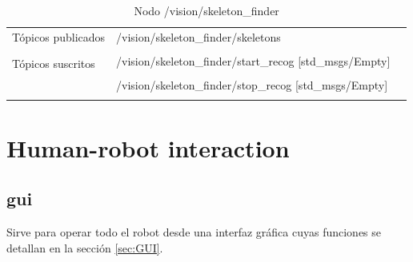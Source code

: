 \documentclass[user_manual.tex]{subfiles}
\begin{document}
\begin{table}[H]
\begin{center}
\begin{tabular}{|l|p{6cm}|p{5cm}|}%
\hline

Tópicos publicados
& /vision/skeleton\_finder/skeletons  &  \\
& & \\
\hline

\multirow{2}{*}{Tópicos suscritos}
& /vision/skeleton\_finder/start\_recog [std\_msgs/Empty] &  \\
& & \\
& /vision/skeleton\_finder/stop\_recog [std\_msgs/Empty] &  \\
& & \\
\cline{1-3}
 
\end{tabular}
\caption{Nodo /vision/skeleton\_finder}
\label{skeleton finder node}
\end{center}
\end{table}

\section{Human-robot interaction}

\subsection{gui}
Sirve para operar todo el robot desde una interfaz gráfica cuyas funciones se detallan en la sección \ref{sec:GUI}.
\end{document}
